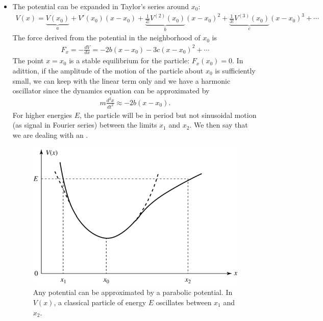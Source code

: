 \begin{itemize}[itemsep=0pt,topsep=0pt]
    \item The potential can be expanded in Taylor's series around $x_0$:
    \begin{align*}
        V(x)=\underbrace{V(x_0)}_{a}+V'(x_0)(x-x_0)+\underbrace{\frac{1}{2!}V^{(2)}(x_0)}_{b}(x-x_0)^2+\underbrace{\frac{1}{3!}V^{(3)}(x_0)}_{c}(x-x_0)^3+\cdots
    \end{align*}
    The force derived from the potential in the neighborhood of $x_0$ is 
    \begin{align}
        F_x=-\frac{dV}{dx}=-2b(x-x_0)-3c(x-x_0)^2+\cdots
    \end{align}
    The point $x=x_0$ is a stable equilibrium for the particle: $F_x(x_0)=0$. In adittion, if the amplitude of the motion of the particle 
    about $x_0$ is sufficiently small, we can keep with the linear term only and we have a harmonic oscillator since the dynamics equation can be approximated by 
    \begin{align*}
        m\frac{d^2x}{dt^2}\approx-2b(x-x_0).
    \end{align*}
    For higher energies $E$, the particle will be in period but not sinusoidal motion (as signal in Fourier series) between the limits $x_1$ and $x_2$. We then say that we are dealing with an .
    \begin{figure}[h!]
        \centering
        \includegraphics[width=.5\columnwidth]{PartOne/ChapterThree/taylorpotential.png}
        \caption{Any potential can be approximated by a parabolic potential. In $V(x)$, a classical particle of energy $E$ oscillates between $x_1$ and $x_2$.}
    \end{figure}
\end{itemize}
%
